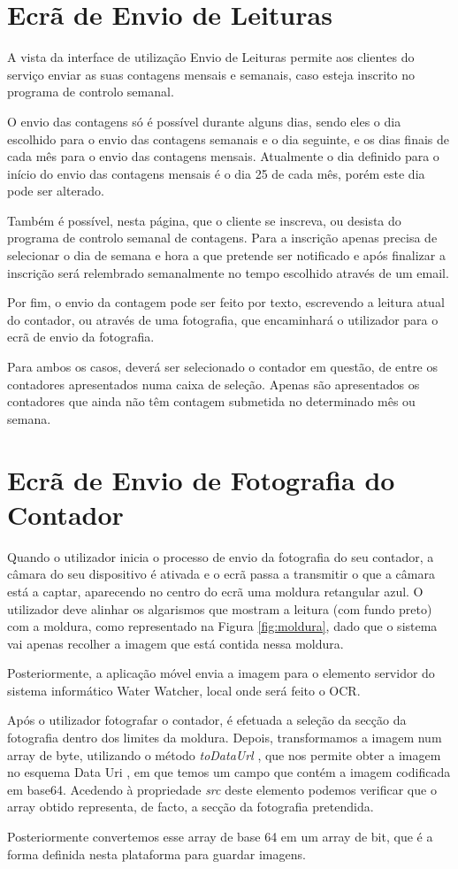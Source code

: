 \section{Ecrã de Envio de Leituras} \label{ecra:def}  %
A vista da interface de utilização Envio de Leituras permite aos clientes do serviço enviar as suas contagens mensais e semanais, caso esteja inscrito no programa de controlo semanal.\par
O envio das contagens só é possível durante alguns dias, sendo eles o dia escolhido para o envio das contagens semanais e o dia seguinte, e os dias finais de cada mês para o envio das contagens mensais. Atualmente o dia definido para o início do envio das contagens mensais é o dia 25 de cada mês, porém este dia pode ser alterado.\par
Também é possível, nesta página, que o cliente se inscreva, ou desista do programa de controlo semanal de contagens. Para a inscrição apenas precisa de selecionar o dia de semana e hora a que pretende ser notificado e após finalizar a inscrição será relembrado semanalmente no tempo escolhido através de um email.\par
Por fim, o envio da contagem pode ser feito por texto, escrevendo a leitura atual do contador, ou através de uma fotografia, que encaminhará o utilizador para o ecrã de envio da fotografia.\par
Para ambos os casos, deverá ser selecionado o contador em questão, de entre os contadores apresentados numa caixa de seleção. Apenas são apresentados os contadores que ainda não têm contagem submetida no determinado mês ou semana.

\section{Ecrã de Envio de Fotografia do Contador} \label{ecra:foto}  %
Quando o utilizador inicia o processo de envio da fotografia do seu contador, a câmara do seu dispositivo é ativada e o ecrã passa a transmitir o que a câmara está a captar, aparecendo no centro do ecrã uma moldura retangular azul. O utilizador deve alinhar os algarismos que mostram a leitura (com fundo preto) com a moldura, como representado na Figura \ref{fig:moldura}, dado que o sistema vai apenas recolher a imagem que está contida nessa moldura.\par
Posteriormente, a aplicação móvel envia a imagem para o elemento servidor do sistema informático Water Watcher, local onde será feito o OCR.\par
Após o utilizador fotografar o contador, é efetuada a seleção da secção da fotografia dentro dos limites da moldura. Depois, transformamos a imagem num array de byte, utilizando o método \textit{toDataUrl} , que nos permite obter a imagem no esquema Data Uri \cite{dataurl}, em que temos um campo que contém a imagem codificada em base64. Acedendo à propriedade \textit{src} deste elemento podemos verificar que o array obtido representa, de facto, a secção da fotografia pretendida.\par
Posteriormente convertemos esse array de base 64 em um array de bit, que é a forma definida nesta plataforma para guardar imagens.

